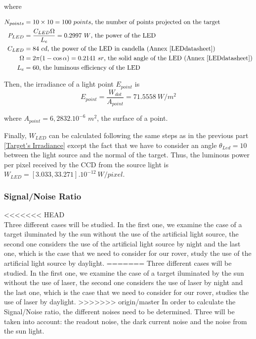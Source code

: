 where

\begin{align*}
N_{points} & = 10\times 10 = 100\ points\mbox{, the number of points projected on the  target}\\
P_{LED} & = \frac{C_{LED}\Omega}{L_e} = 0.2997\ W\mbox{, the power of the LED}\\
C_{LED} & = 84\ cd\mbox{, the power of the LED in candella (Annex \ref{LEDdatasheet})}\\
\Omega & = 2\pi (1-\cos \alpha) = 0.2141\ sr\mbox{, the solid angle of the LED (Annex \ref{LEDdatasheet})}\\
L_e & = 60\mbox{, the luminous efficiency of the LED}
\end{align*}

Then, the irradiance of a light point $E_{point}$ is
\begin{equation}
E_{point} = \frac{W_{dot}}{A_{point}} = 71.5558\ W/m^2
\end{equation}

where $A_{point} = 6,2832.10^{-6}$ $m^2$, the surface of a point.

Finally, $W_{LED}$ can be calculated following the same steps as in the previous part \ref{Target's Irradiance} except the fact that we have to consider an angle $\theta_{Led} = 10$\textdegree $ $ between the light source and the normal of the target. Thus, the luminous power per pixel received by the CCD from the source light is $W_{LED} = [3.033, 33.271].10^{-12}\ W/pixel$.






\subsubsection{Signal/Noise Ratio}
<<<<<<< HEAD
~\\
Three different cases will be studied. In the first one, we examine the case of a target iluminated by the sun without the use of the artificial light source, the second one considers the use of the artificial light source by night and the last one, which is the case that we need to consider for our rover, study the use of the artificial light source by daylight.
=======
Three different cases will be studied. In the first one, we examine the case of a target iluminated by the sun without the use of laser, the second one considers the use of laser by night and the last one, which is the case that we need to consider for our rover, studies the use of laser by daylight.
>>>>>>> origin/master
In order to calculate the Signal/Noise ratio, the different noises need to be determined. Three will be taken into account: the readout noise, the dark current noise and the noise from the sun light. 

